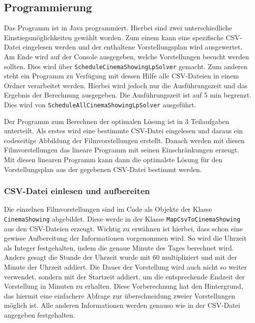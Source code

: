 \documentclass[a4paper, 12pt]{article}
\begin{document}
\subsection{Programmierung}

Das Programm ist in Java programmiert.
Hierbei sind zwei unterschiedliche Einstiegsmöglichkeiten gewählt worden. 
Zum einem kann eine spezifische CSV-Datei eingelesen werden und der enthaltene Vorstellungsplan wird ausgewertet.
Am Ende wird auf der Console ausgegeben, welche Vorstellungen besucht werden sollten. 
Dies wird über \texttt{ScheduleCinemaShowingLpSolver} gemacht.
Zum anderen steht ein Programm zu Verfügung mit dessen Hilfe alle CSV-Dateien in einem Ordner verarbeitet werden.
Hierbei wird jedoch nur die Ausführungszeit und das Ergebnis der Berechnung ausgegeben.
Die Ausführungszeit ist auf 5 min begrenzt.
Dies wird von \linebreak \texttt{ScheduleAllCinemaShowingLpSolver} ausgeführt.

Der Programm zum Berechnen der optimalen Lösung ist in 3 Teilaufgaben unterteilt. 
Als erstes wird eine bestimmte CSV-Datei eingelesen und daraus ein codeseitige Abbildung der Filmvorstellungen erstellt.
Danach werden mit diesen Filmvorstellungen das lineare Programm mit seinen Einschränkungen erzeugt.
Mit diesen linearen Programm kann dann die optimalste Lösung für den Vorstellungsplan aus der gegebenen CSV-Datei bestimmt werden.

\subsubsection{CSV-Datei einlesen und aufbereiten}

Die einzelnen Filmvorstellungen sind im Code als Objekte der Klasse \linebreak \texttt{CinemaShowing} abgebildet.
Diese werde in der Klasse  \linebreak \texttt{MapCsvToCinemaShowing} aus den CSV-Dateien erzeugt.
Wichtig zu erwähnen ist hierbei, dass schon eine gewisse Aufbereitung der Informationen vorgenommen wird.
So wird die Uhrzeit als Integer festgehalten, indem die genaue Minute des Tages berechnet wird. 
Anders gesagt die Stunde der Uhrzeit wurde mit 60 multipliziert und mit der Minute der Uhrzeit addiert.
Die Dauer der Vorstellung wird auch nicht so weiter verwendet, sondern mit der Startzeit addiert, um die entsprechende Endzeit der Vorstellung in Minuten zu erhalten.
Diese Vorberechnung hat den Hintergrund, das hiermit eine einfachere Abfrage zur überschneidung zweier Vorstellungen möglich ist.
Alle anderen Informationen werden genauso wie in der CSV-Datei angegeben festgehalten.
\end{document}
